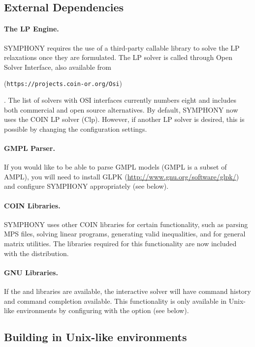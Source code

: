 \subsection{External Dependencies}

\paragraph{The LP Engine.} SYMPHONY requires the use of a third-party
  callable library to solve the LP relaxations once they are formulated. The
LP solver is called through Open Solver Interface, also available from
\begin{latexonly} 
(\texttt{https://projects.coin-or.org/Osi})
\end{latexonly}.
The list of solvers with OSI interfaces currently numbers eight and includes
both commercial and open source alternatives. By default, SYMPHONY now uses
the COIN LP solver (Clp). However, if another LP solver is desired, this is
possible by changing the configuration settings.

\paragraph{GMPL Parser.} If you would like to be able to parse GMPL models
(GMPL is a subset of AMPL), you will need to install GLPK
(\url{http://www.gnu.org/software/glpk/}) and configure SYMPHONY appropriately
(see below).

\paragraph{COIN Libraries.} SYMPHONY uses other COIN libraries for certain
functionality, such as parsing MPS files, solving linear programs, generating
valid inequalities, and for general matrix utilities. The libraries required
for this functionality are now included with the distribution.

\paragraph{GNU Libraries.} If the  and  libraries
are available, the interactive solver will have command history and command
completion available. This functionality is only available in Unix-like
environments by configuring with the  option (see
below).

\subsection{Building in Unix-like environments}
\label{getting_started_unix}

